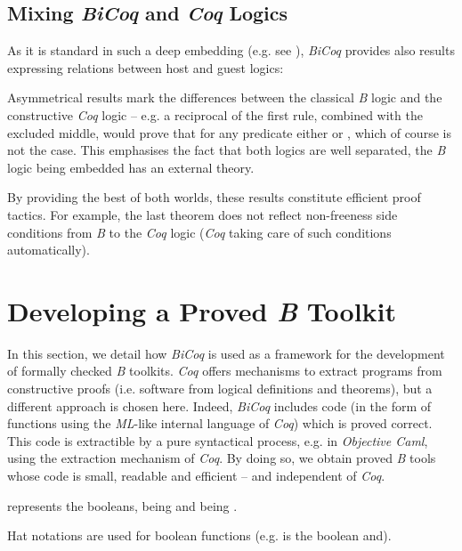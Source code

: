 \documentclass{llncs}
\begin{document}
\subsection{Mixing \emph{BiCoq} and \emph{Coq} Logics}\label{ss_mixing}

As it is standard in such a deep embedding (e.g. see \cite{brk:1}), \emph{BiCoq} provides also 
results expressing relations between host and guest logics:

Asymmetrical results mark the differences between the classical \emph{B} logic and the 
constructive \emph{Coq} logic -- e.g. a reciprocal of the first rule, combined with the 
excluded middle, would prove that for any predicate  either  or , 
which of course is not the case. This emphasises the fact that both logics are well separated, 
the \emph{B} logic being embedded has an external theory.

By providing the best of both worlds, these results constitute efficient proof tactics. For 
example, the last theorem does not reflect non-freeness side conditions from \emph{B} to the 
\emph{Coq} logic (\emph{Coq} taking care of such conditions automatically).

\section{Developing a Proved \emph{B} Toolkit}\label{sc_environ}

In this section, we detail how \emph{BiCoq} is used as a framework for the development of 
formally checked \emph{B} toolkits. \emph{Coq} offers mechanisms to extract programs from 
constructive proofs (i.e. software from logical definitions and theorems), but a different 
approach is chosen here. Indeed, \emph{BiCoq} includes code (in the form of functions using 
the \emph{ML}-like internal language of \emph{Coq}) which is proved correct. This code is 
extractible by a pure syntactical process, e.g. in \emph{Objective Caml}, using the extraction 
mechanism of \emph{Coq}. By doing so, we obtain proved \emph{B} tools whose code is small, 
readable and efficient -- and independent of \emph{Coq}.

\begin{notation}\small represents the booleans,  being  and  being 
.
\end{notation}

\begin{notation}\small Hat notations are used for boolean functions (e.g.  
is the boolean and).
\end{notation}
\end{document}
